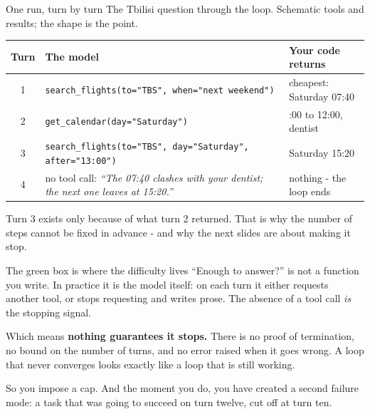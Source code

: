 \documentclass[aspectratio=169]{beamer}
\newcommand{\keybox}[1]{%
  \begin{tcolorbox}[colback=armblue!8, colframe=armblue, boxrule=0.6pt, arc=2pt]
  #1
  \end{tcolorbox}}
\newcommand{\trapbox}[1]{%
  \begin{tcolorbox}[colback=armred!8, colframe=armred, boxrule=0.6pt, arc=2pt]
  #1
  \end{tcolorbox}}
\begin{document}
\begin{frame}{One run, turn by turn}
  \vspace{0.2em}
  {\small The Tbilisi question through the loop. Schematic tools and results; the shape is the
  point.}

  \vspace{0.3em}
  \begin{center}
  \footnotesize
  \begin{tabular}{c>{\raggedright\arraybackslash}p{}>{\raggedright\arraybackslash}p{}}
    \toprule
    \textbf{Turn} & \textbf{The model} & \textbf{Your code returns} \\
    \midrule
    1 & \texttt{search\_flights(to="TBS", when="next weekend")} & cheapest: Saturday 07:40 \\
    2 & \texttt{get\_calendar(day="Saturday")} & 10:00 to 12:00, dentist \\
    3 & \texttt{search\_flights(to="TBS", day="Saturday", after="13:00")} & Saturday 15:20 \\
    4 & no tool call: \emph{``The 07:40 clashes with your dentist; the next one leaves at
      15:20.''} & nothing - the loop ends \\
    \bottomrule
  \end{tabular}
  \end{center}

  \vspace{0.3em}
  \keybox{Turn 3 exists only because of what turn 2 returned. That is why the number of steps
  cannot be fixed in advance - and why the next slides are about making it stop.}
\end{frame}

\begin{frame}{The green box is where the difficulty lives}
  \vspace{0.7em}
  ``Enough to answer?'' is not a function you write. In practice it is the model itself: on each
  turn it either requests another tool, or stops requesting and writes prose. The absence of a
  tool call \emph{is} the stopping signal.

  \vspace{0.9em}
  \trapbox{Which means \textbf{nothing guarantees it stops.} There is no proof of termination,
  no bound on the number of turns, and no error raised when it goes wrong. A loop that never
  converges looks exactly like a loop that is still working.}

  \vspace{0.8em}
  \keybox{So you impose a cap. And the moment you do, you have created a second failure mode:
  a task that was going to succeed on turn twelve, cut off at turn ten.}
\end{frame}
\end{document}
